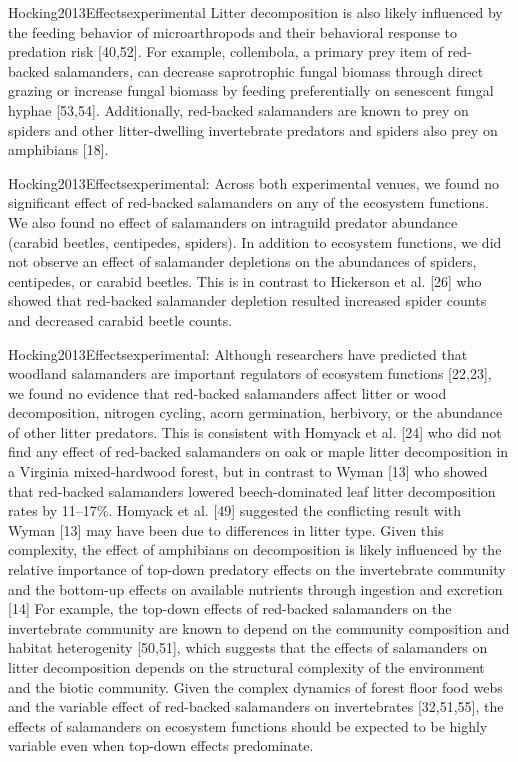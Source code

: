 Hocking2013Effectsexperimental
Litter decomposition is also likely influenced by the feeding behavior of microarthropods and their behavioral response to predation risk [40,52]. 
For example, collembola, a primary prey item of red-backed salamanders, can decrease saprotrophic fungal biomass through direct grazing or increase fungal biomass by feeding preferentially on senescent fungal hyphae [53,54].
Additionally, red-backed salamanders are known to prey on spiders and other litter-dwelling invertebrate predators and spiders also prey on amphibians [18].



Hocking2013Effectsexperimental: 
Across both experimental venues, we found no significant effect of red-backed salamanders on any of the ecosystem functions. We also found no effect of salamanders on intraguild predator abundance (carabid beetles, centipedes, spiders).
In addition to ecosystem functions, we did not observe an effect of salamander depletions on the abundances of spiders, centipedes, or carabid beetles. This is in contrast to Hickerson et al. [26] who showed that red-backed salamander depletion resulted increased spider counts and decreased carabid beetle counts.

Hocking2013Effectsexperimental:
Although researchers have predicted that woodland salamanders are important regulators of ecosystem functions [22,23], we found no evidence that red-backed salamanders affect litter or wood decomposition, 
nitrogen cycling, acorn germination, herbivory, or the abundance of other litter predators.
This is consistent with Homyack et al. [24] who did not find any effect of red-backed salamanders on oak or maple litter decomposition in a Virginia mixed-hardwood forest, 
but in contrast to Wyman [13] who showed that red-backed salamanders lowered beech-dominated leaf litter decomposition rates by 11–17\%. 
Homyack et al. [49] suggested the conflicting result with Wyman [13] may have been due to differences in litter type.
Given this complexity, the effect of amphibians on decomposition is likely influenced by the relative importance of top-down predatory effects on the invertebrate community and the bottom-up effects 
on available nutrients through ingestion and excretion [14]
For example, the top-down effects of red-backed salamanders on the invertebrate community are known to depend on the community composition and habitat heterogenity [50,51], which suggests that the effects of salamanders on litter decomposition depends on the structural complexity of the environment and the biotic community.
Given the complex dynamics of forest floor food webs and the variable effect of red-backed salamanders on invertebrates [32,51,55], the effects of salamanders on ecosystem functions should be expected to be highly variable even when top-down effects predominate.

